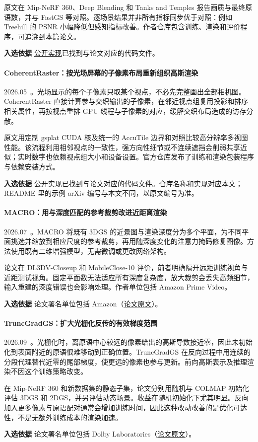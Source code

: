 原文在 Mip-NeRF 360、Deep Blending 和 Tanks and Temples 报告画质与最终原语数，并与 FastGS 等对照。逐场景结果并非所有指标同步优于对照：例如 Treehill 的 PSNR 小幅降低但感知指标改善。作者仓库包含训练、渲染和评价程序，可追溯到本篇论文。

\textbf{入选依据} \href{https://github.com/aaronnzh/legs}{公开实现}已找到与论文对应的代码文件。

\paragraph{CoherentRaster：按光场屏幕的子像素布局重新组织高斯渲染}
2026.05~\cite{2605_04509}。光场显示的每个子像素只取某个视点，不必先完整画出全部相机图。CoherentRaster 直接计算参与交织输出的子像素，在邻近视点组复用投影和排序相关属性，再按视点重排 GPU 线程与子像素的对应，缓解交织布局造成的访存分散。

原文用定制 gsplat CUDA 核及统一的 AccuTile 边界和对照比较高分辨率多视图性能。该流程利用相邻视点的一致性，强方向性细节或不连续遮挡会削弱共享近似；实时数字也依赖视点组大小和设备设置。官方仓库发布了训练和渲染包装程序与依赖安装方式。

\textbf{入选依据} \href{https://github.com/sgj0402/coherent-raster}{公开实现}已找到与论文对应的代码文件。仓库名称和实现对应本文；README 里的示例 arXiv 编号与本文不同，以原文编号为准。

\paragraph{MACRO：用与深度匹配的参考裁剪改进近距离渲染}
2026.07~\cite{2607_03875}。MACRO 将既有 3DGS 的近景图与渲染深度分为多个平面，为不同平面挑选并缩放到相应尺度的参考裁剪，再用随深度变化的注意力掩码修复图像。方法使用既有二维增强模型，无需微调或更改网络架构。

论文在 DL3DV-Closeup 和 MobileClose-10 评价，前者明确隔开远距训练视角与近距测试视角。固定平面数无法适应所有深度复杂度，放大裁剪会丢失高频细节，输入重建的深度错误也会影响处理。作者单位包括 Amazon Prime Video。

\textbf{入选依据} 论文署名单位包括 Amazon（\href{https://arxiv.org/html/2607.03875v2}{论文原文}）。

\paragraph{TruncGradGS：扩大光栅化反传的有效梯度范围}
2026.09~\cite{2609_03534}。光栅化时，离原语中心较远的像素给出的高斯导数接近零，因此未初始化到表面附近的原语很难移动到正确位置。TruncGradGS 在反向过程中用连续的分段代理替代近零的尾部梯度，使更远的像素也参与更新。前向高斯表示及推理渲染不因这个训练策略改变。

在 Mip-NeRF 360 和新数据集的静态子集，论文分别用随机与 COLMAP 初始化评估 3DGS 和 2DGS，并另评估动态场景。收益在随机初始化下尤其明显。反向加入更多像素与原语配对通常会增加训练时间，因此这种改动改善的是优化可达性，不是无额外训练成本的渲染加速。

\textbf{入选依据} 论文署名单位包括 Dolby Laboratories（\href{https://arxiv.org/abs/2609.03534}{论文原文}）。
